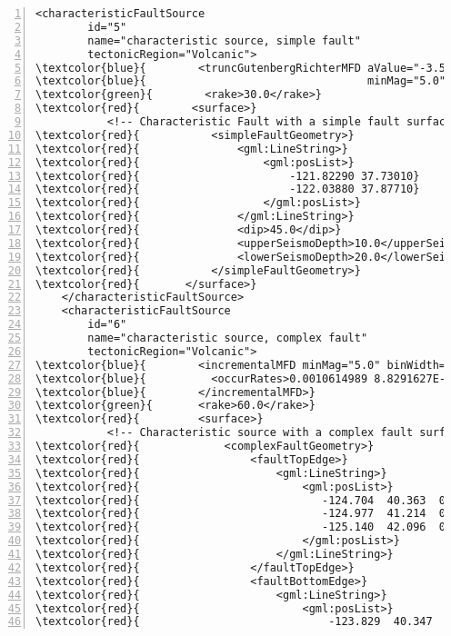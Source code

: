 \begin{Verbatim}[frame=single, commandchars=\\\{\}, fontsize=\footnotesize,
    numbers=left, numbersep=2pt]
    <characteristicFaultSource
        id="5"
        name="characteristic source, simple fault"
        tectonicRegion="Volcanic">
\textcolor{blue}{        <truncGutenbergRichterMFD aValue="-3.5" bValue="1.0"}
\textcolor{blue}{                                  minMag="5.0" maxMag="6.5" />}
\textcolor{green}{        <rake>30.0</rake>}
\textcolor{red}{        <surface>}
           <!-- Characteristic Fault with a simple fault surface -->
\textcolor{red}{           <simpleFaultGeometry>}
\textcolor{red}{               <gml:LineString>}
\textcolor{red}{                   <gml:posList>}
\textcolor{red}{                       -121.82290 37.73010}
\textcolor{red}{                       -122.03880 37.87710}
\textcolor{red}{                   </gml:posList>}
\textcolor{red}{               </gml:LineString>}
\textcolor{red}{               <dip>45.0</dip>}
\textcolor{red}{               <upperSeismoDepth>10.0</upperSeismoDepth>}
\textcolor{red}{               <lowerSeismoDepth>20.0</lowerSeismoDepth>}
\textcolor{red}{           </simpleFaultGeometry>}
\textcolor{red}{       </surface>}
    </characteristicFaultSource>
    <characteristicFaultSource
        id="6"
        name="characteristic source, complex fault"
        tectonicRegion="Volcanic">
\textcolor{blue}{        <incrementalMFD minMag="5.0" binWidth="0.1">}
\textcolor{blue}{          <occurRates>0.0010614989 8.8291627E-4 7.3437777E-4</occurRates>}
\textcolor{blue}{        </incrementalMFD>}
\textcolor{green}{       <rake>60.0</rake>}
\textcolor{red}{         <surface>}
           <!-- Characteristic source with a complex fault surface -->
\textcolor{red}{             <complexFaultGeometry>}
\textcolor{red}{                 <faultTopEdge>}
\textcolor{red}{                     <gml:LineString>}
\textcolor{red}{                         <gml:posList>}
\textcolor{red}{                            -124.704  40.363  0.5493260E+01}
\textcolor{red}{                            -124.977  41.214  0.4988560E+01}
\textcolor{red}{                            -125.140  42.096  0.4897340E+01}
\textcolor{red}{                         </gml:posList>}
\textcolor{red}{                     </gml:LineString>}
\textcolor{red}{                 </faultTopEdge>}
\textcolor{red}{                 <faultBottomEdge>}
\textcolor{red}{                     <gml:LineString>}
\textcolor{red}{                         <gml:posList>}
\textcolor{red}{                             -123.829  40.347  0.2038490E+02}

\end{Verbatim}
